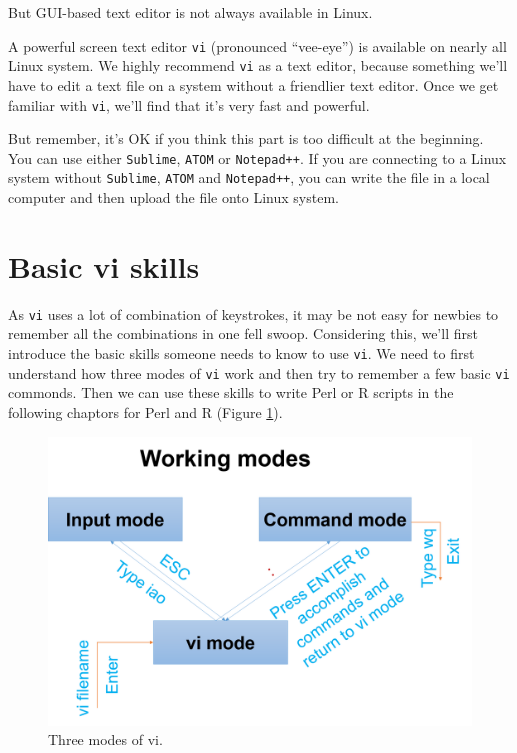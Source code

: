 \documentclass[]{book}
\begin{document}
But GUI-based text editor is not always available in Linux.

A powerful screen text editor \texttt{vi} (pronounced ``vee-eye'') is available on nearly all Linux system. We highly recommend \texttt{vi} as a text editor, because something we'll have to edit a text file on a system without a friendlier text editor. Once we get familiar with \texttt{vi}, we'll find that it's very fast and powerful.

But remember, it's OK if you think this part is too difficult at the beginning. You can use either \texttt{Sublime}, \texttt{ATOM} or \texttt{Notepad++}. If you are connecting to a Linux system without \texttt{Sublime}, \texttt{ATOM} and \texttt{Notepad++}, you can write the file in a local computer and then upload the file onto Linux system.

\hypertarget{basic-vi-skills}{%
\section{Basic vi skills}\label{basic-vi-skills}}

As \texttt{vi} uses a lot of combination of keystrokes, it may be not easy for newbies to remember all the combinations in one fell swoop. Considering this, we'll first introduce the basic skills someone needs to know to use \texttt{vi}. We need to first understand how three modes of \texttt{vi} work and then try to remember a few basic \texttt{vi} commonds. Then we can use these skills to write Perl or R scripts in the following chaptors for Perl and R (Figure \ref{fig:workingModeVi}).



\begin{figure}
\centering
\includegraphics{figures/workingModeVi.png}
\caption{\label{fig:workingModeVi}Three modes of vi.}
\end{figure}
\end{document}
